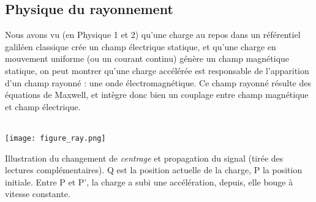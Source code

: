 \subsection{Physique du rayonnement}
Nous avons vu (en Physique 1 et 2) qu'une charge au repos dans un référentiel galiléen classique crée un champ électrique statique, et qu'une charge en mouvement uniforme (ou un courant continu) génère un champ magnétique statique, on peut montrer qu'une charge accélérée est responsable de l'apparition d'un champ rayonné : une onde électromagnétique. Ce champ rayonné résulte des équations de Maxwell, et intègre donc bien un couplage entre champ magnétique et champ électrique. \\ \\
\begin{marginfigure}[1.5cm]
	\centering
	\texttt{[image: figure\_ray.png]}
	\caption{Illustration du changement de \textit{centrage} et propagation du signal (tirée des lectures complémentaires). Q est la position actuelle de la charge, P la position initiale. Entre P et P', la charge a subi une accélération, depuis, elle bouge à vitesse constante.}%
	\label{fig:yo2}
\end{marginfigure}


